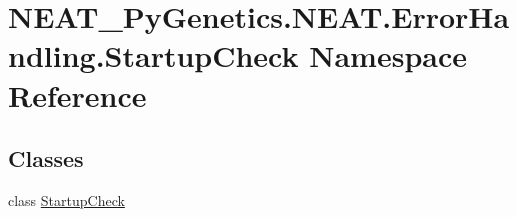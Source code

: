 \hypertarget{namespaceNEAT__PyGenetics_1_1NEAT_1_1ErrorHandling_1_1StartupCheck}{}\section{N\+E\+A\+T\+\_\+\+Py\+Genetics.\+N\+E\+A\+T.\+Error\+Handling.\+Startup\+Check Namespace Reference}
\label{namespaceNEAT__PyGenetics_1_1NEAT_1_1ErrorHandling_1_1StartupCheck}
\subsection*{Classes}
\begin{DoxyCompactItemize}
\item 
class \hyperlink{classNEAT__PyGenetics_1_1NEAT_1_1ErrorHandling_1_1StartupCheck_1_1StartupCheck}{Startup\+Check}
\end{DoxyCompactItemize}
